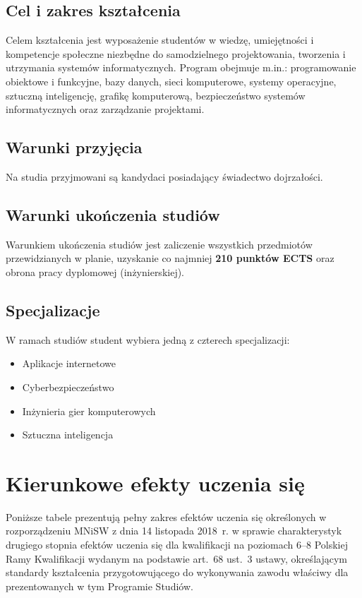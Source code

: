 \documentclass[12pt,a4paper]{article}
\begin{document}
\subsection{Cel i zakres kształcenia}

Celem kształcenia jest wyposażenie studentów w wiedzę, umiejętności i kompetencje społeczne niezbędne do samodzielnego projektowania, tworzenia i utrzymania systemów informatycznych. Program obejmuje m.in.: programowanie obiektowe i funkcyjne, bazy danych, sieci komputerowe, systemy operacyjne, sztuczną inteligencję, grafikę komputerową, bezpieczeństwo systemów informatycznych oraz zarządzanie projektami.

\subsection{Warunki przyjęcia}

Na studia przyjmowani są kandydaci posiadający świadectwo dojrzałości.

\subsection{Warunki ukończenia studiów}

Warunkiem ukończenia studiów jest zaliczenie wszystkich przedmiotów przewidzianych w planie, uzyskanie co najmniej \textbf{210 punktów ECTS} oraz obrona pracy dyplomowej (inżynierskiej).

\subsection{Specjalizacje}

W ramach studiów student wybiera jedną z czterech specjalizacji:
\begin{itemize}
  \item Aplikacje internetowe
  \item Cyberbezpieczeństwo
  \item Inżynieria gier komputerowych
  \item Sztuczna inteligencja
\end{itemize}

\newpage

\section{Kierunkowe efekty uczenia się}

Poniższe tabele prezentują pełny zakres efektów uczenia się określonych w rozporządzeniu MNiSW z dnia 14 listopada 2018~r. w sprawie charakterystyk drugiego stopnia efektów uczenia się dla kwalifikacji na poziomach 6--8 Polskiej Ramy Kwalifikacji wydanym na podstawie art.~68 ust.~3 ustawy, określającym standardy kształcenia przygotowującego do wykonywania zawodu właściwy dla prezentowanych w tym Programie Studiów.
\end{document}
